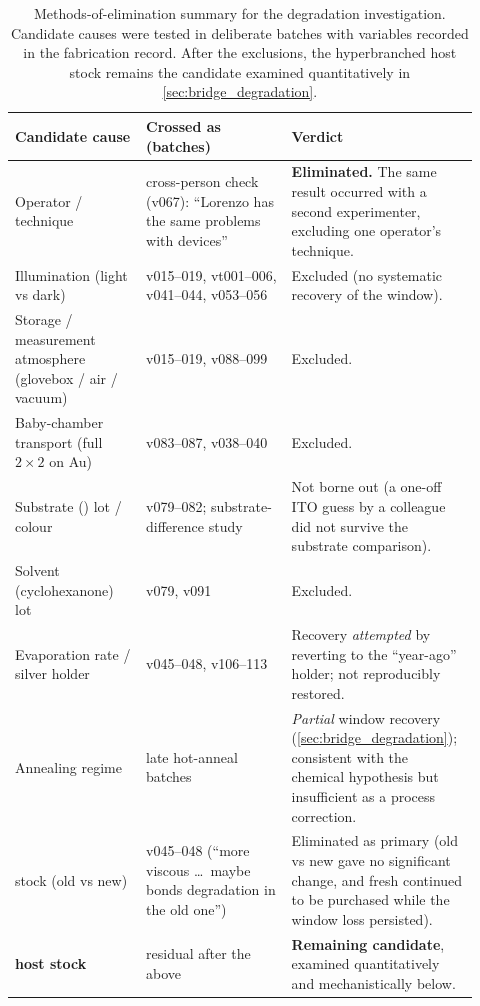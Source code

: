 \documentclass[12pt, twoside]{report}
\begin{document}
\begin{table}[htbp]
  \centering
  \caption[Methods-of-elimination summary]{Methods-of-elimination summary for the degradation investigation. Candidate causes were tested in deliberate batches with variables recorded in the fabrication record. After the exclusions, the hyperbranched \Hybrane{} host stock remains the candidate examined quantitatively in \cref{sec:bridge_degradation}.}
  \label{tab:bridge_elimination}
  \footnotesize
  \setlength{\tabcolsep}{4pt}
  \renewcommand{\arraystretch}{1.05}
  \begin{tabular}{>{\raggedright\arraybackslash}p{0.27\linewidth} >{\raggedright\arraybackslash}p{0.30\linewidth} >{\raggedright\arraybackslash}p{0.35\linewidth}}
    \toprule
    \textbf{Candidate cause} & \textbf{Crossed as (batches)} & \textbf{Verdict} \\
    \midrule
    Operator / technique & cross-person check (v067): ``Lorenzo has the same problems with devices'' & \textbf{Eliminated.} The same result occurred with a second experimenter, excluding one operator's technique. \\
    Illumination (light vs dark) & v015--019, vt001--006, v041--044, v053--056 & Excluded (no systematic recovery of the window). \\
    Storage / measurement atmosphere (glovebox / air / vacuum) & v015--019, v088--099 & Excluded. \\
    Baby-chamber transport (full $2\times2$ on Au) & v083--087, v038--040 & Excluded. \\
    Substrate (\ITO{}) lot / colour & v079--082; substrate-difference study & Not borne out (a one-off ITO guess by a colleague did not survive the substrate comparison). \\
    Solvent (cyclohexanone) lot & v079, v091 & Excluded. \\
    Evaporation rate / silver holder & v045--048, v106--113 & Recovery \emph{attempted} by reverting to the ``year-ago'' holder; not reproducibly restored. \\
    Annealing regime & late hot-anneal batches & \emph{Partial} window recovery (\cref{sec:bridge_degradation}); consistent with the chemical hypothesis but insufficient as a process correction. \\
    \SY{} stock (old vs new) & v045--048 (``more viscous \ldots\ maybe bonds degradation in the old one'') & Eliminated as primary (old vs new \SY{} gave no significant change, and fresh \SY{} continued to be purchased while the window loss persisted). \\
    \midrule
    \textbf{\Hybrane{} host stock} & residual after the above & \textbf{Remaining candidate}, examined quantitatively and mechanistically below. \\
    \bottomrule
  \end{tabular}
\end{table}
\end{document}
